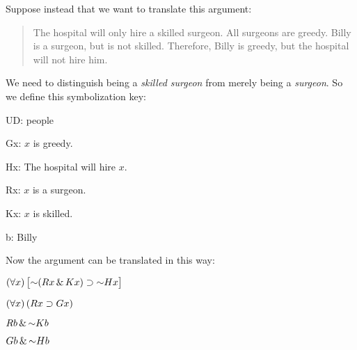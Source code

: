 Suppose instead that we want to translate this argument:
\begin{quote}
The hospital will only hire a skilled surgeon. All surgeons are greedy. Billy is a surgeon, but is not skilled. Therefore, Billy is greedy, but the hospital will not hire him.
\end{quote}
We need to distinguish being a \emph{skilled surgeon} from merely being a \emph{surgeon}. So we define this symbolization key:
\begin{ekey}
\item[UD:] people
\item[Gx:] $x$ is greedy.
\item[Hx:] The hospital will hire $x$.
\item[Rx:] $x$ is a surgeon.
\item[Kx:] $x$ is skilled.
\item[b:] Billy
\end{ekey}

Now the argument can be translated in this way:
\begin{earg}
\label{surgeon2}
\item[] $\qt{\forall}{x}\bigl[\enot (Rx \eand Kx) \eif \enot Hx\bigr]$
\item[] $(\forall x) \,(Rx \supset Gx)$
\item[] $Rb \eand \enot Kb$
\item[\therefore] $Gb \eand \enot Hb$
\end{earg}

